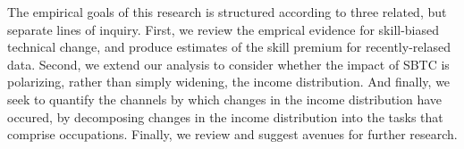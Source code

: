 The empirical goals of this research is structured according to three related, but separate lines of inquiry. First, we review the emprical evidence for skill-biased technical change, and produce estimates of the skill premium for recently-relased data. Second, we extend our analysis to consider whether the impact of SBTC is polarizing, rather than simply widening, the income distribution. And finally, we seek to quantify the channels by which changes in the income distribution have occured, by  decomposing changes in the income distribution into the tasks that comprise occupations. Finally, we review and suggest avenues for further research.

